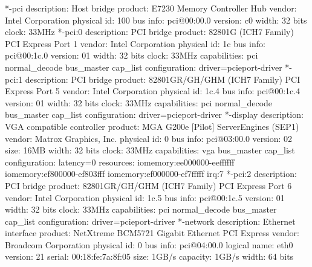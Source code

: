 \documentclass[mingoth,a4paper]{jsarticle}
\begin{document}
\begin{commandline}
     *-pci
          description: Host bridge
          product: E7230 Memory Controller Hub
          vendor: Intel Corporation
          physical id: 100
          bus info: pci@00:00.0
          version: c0
          width: 32 bits
          clock: 33MHz
        *-pci:0
             description: PCI bridge
             product: 82801G (ICH7 Family) PCI Express Port 1
             vendor: Intel Corporation
             physical id: 1c
             bus info: pci@00:1c.0
             version: 01
             width: 32 bits
             clock: 33MHz
             capabilities: pci normal_decode bus_master cap_list
             configuration: driver=pcieport-driver
        *-pci:1
             description: PCI bridge
             product: 82801GR/GH/GHM (ICH7 Family) PCI Express Port 5
             vendor: Intel Corporation
             physical id: 1c.4
             bus info: pci@00:1c.4
             version: 01
             width: 32 bits
             clock: 33MHz
             capabilities: pci normal_decode bus_master cap_list
             configuration: driver=pcieport-driver
           *-display
                description: VGA compatible controller
                product: MGA G200e [Pilot] ServerEngines (SEP1)
                vendor: Matrox Graphics, Inc.
                physical id: 0
                bus info: pci@03:00.0
                version: 02
                size: 16MB
                width: 32 bits
                clock: 33MHz
                capabilities: vga bus_master cap_list
                configuration: latency=0
                resources: iomemory:ee000000-eeffffff iomemory:ef800000-ef803fff iomemory:ef000000-ef7fffff irq:7
        *-pci:2
             description: PCI bridge
             product: 82801GR/GH/GHM (ICH7 Family) PCI Express Port 6
             vendor: Intel Corporation
             physical id: 1c.5
             bus info: pci@00:1c.5
             version: 01
             width: 32 bits
             clock: 33MHz
             capabilities: pci normal_decode bus_master cap_list
             configuration: driver=pcieport-driver
           *-network
                description: Ethernet interface
                product: NetXtreme BCM5721 Gigabit Ethernet PCI Express
                vendor: Broadcom Corporation
                physical id: 0
                bus info: pci@04:00.0
                logical name: eth0
                version: 21
                serial: 00:18:fe:7a:8f:05
                size: 1GB/s
                capacity: 1GB/s
                width: 64 bits

\end{commandline}
\end{document}
